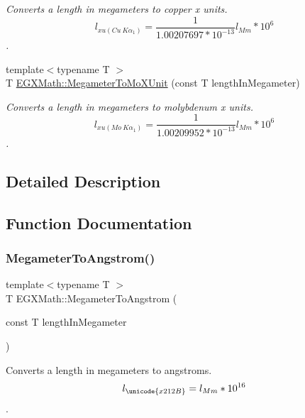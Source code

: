 \begin{DoxyCompactItemize}
\begin{DoxyCompactList}\small\item\em Converts a length in megameters to copper x units. \[ l_{xu(Cu\ K\alpha_1)}= \frac{1}{1.00207697*10^{-13}} l_{Mm} * 10^{6}\]. \end{DoxyCompactList}\item 
{\footnotesize template$<$typename T $>$ }\\T \mbox{\hyperlink{group___e_g_x_math-_conversions-_length_conversions-_s_i-_megameter-_non-_s_i_ga134a9fb2603b93c739c4ee58864f69c6}{E\+G\+X\+Math\+::\+Megameter\+To\+Mo\+X\+Unit}} (const T length\+In\+Megameter)
\begin{DoxyCompactList}\small\item\em Converts a length in megameters to molybdenum x units. \[ l_{xu(Mo\ K\alpha_1)}=\frac{1}{1.00209952*10^{-13}} l_{Mm} * 10^{6}\]. \end{DoxyCompactList}\end{DoxyCompactItemize}


\subsection{Detailed Description}


\subsection{Function Documentation}
\mbox{\label{group___e_g_x_math-_conversions-_length_conversions-_s_i-_megameter-_non-_s_i_gac4c7e615f4ec3d000ac341a5bf9a79a0}} 
\subsubsection{\texorpdfstring{Megameter\+To\+Angstrom()}{MegameterToAngstrom()}}
{\footnotesize\ttfamily template$<$typename T $>$ \\
T E\+G\+X\+Math\+::\+Megameter\+To\+Angstrom (\begin{DoxyParamCaption}\item[{const T}]{length\+In\+Megameter }\end{DoxyParamCaption})}



Converts a length in megameters to angstroms. \[ l_{\unicode{x212B}}=l_{Mm} * 10^{16} \]. 

